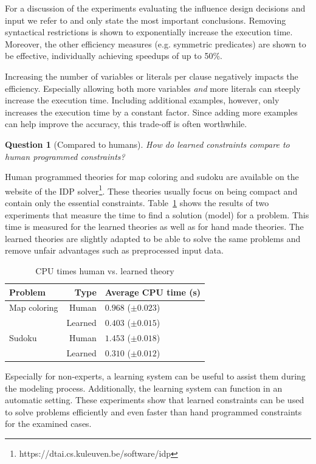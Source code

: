 \documentclass[letterpaper]{article}
\newtheorem{question}{Question}
\theoremstyle{definition}
\begin{document}
For a discussion of the experiments evaluating the influence design decisions and input we refer to \cite{kolb2015thesis} and only state the most important conclusions.
Removing syntactical restrictions is shown to exponentially increase the execution time.
Moreover, the other efficiency measures (e.g. symmetric predicates) are shown to be effective, individually achieving speedups of up to 50\%.

Increasing the number of variables or literals per clause negatively impacts the efficiency.
Especially allowing both more variables \emph{and} more literals can steeply increase the execution time.
Including additional examples, however, only increases the execution time by a constant factor.
Since adding more examples can help improve the accuracy, this trade-off is often worthwhile.

\begin{question}[Compared to humans]
  How do learned constraints compare to human programmed constraints?
\end{question}
Human programmed theories for map coloring and sudoku are available on the website of the IDP solver\footnote{https://dtai.cs.kuleuven.be/software/idp}.
These theories usually focus on being compact and contain only the essential constraints.
Table~\ref{tbl:mens} shows the results of two experiments that measure the time to find a solution (model) for a problem.
This time is measured for the learned theories as well as for hand made theories.
The learned theories are slightly adapted to be able to solve the same problems and remove unfair advantages such as preprocessed input data.

  \begin{table}[!htp]
    \caption{CPU times human vs. learned theory}
    \begin{tabularx}{\linewidth}{lr|X}
      \textbf{Problem} & \textbf{Type} & \textbf{Average CPU time (s)} \\
      \toprule
      Map coloring & Human & $0.968$  ($\pm 0.023$) \\
      & Learned & $0.403$       ($\pm 0.015$) \\
      \midrule
      Sudoku & Human & $1.453$    ($\pm 0.018$) \\
      & Learned & $0.310$       ($\pm 0.012$)
    \end{tabularx}
    \label{tbl:mens}
  \end{table}

Especially for non-experts, a learning system can be useful to assist them during the modeling process.
Additionally, the learning system can function in an automatic setting.
These experiments show that learned constraints can be used to solve problems efficiently and even faster than hand programmed constraints for the examined cases.
\end{document}
